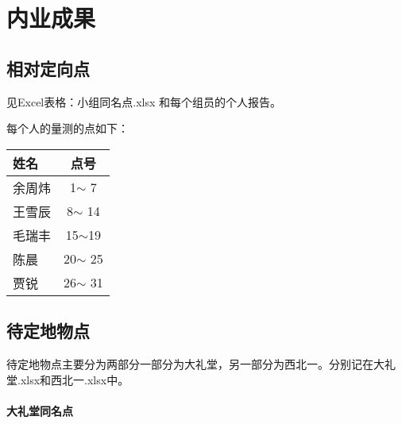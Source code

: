 \chapter{内业成果}
\section{相对定向点}

见Excel表格：小组同名点.xlsx 和每个组员的个人报告。

每个人的量测的点如下：
\begin{table}[htbp]
  \centering
  \begin{tabular}{p{5cm}c}
    \toprule
    姓名 & 点号 \\
    \midrule
    余周炜 & 1$\sim$ 7 \\
    王雪辰 & 8$\sim$ 14 \\
    毛瑞丰 & 15$\sim$19 \\
    陈晨 & 20$\sim$ 25 \\
    贾锐 & 26$\sim$ 31 \\
    \bottomrule 
  \end{tabular}
\end{table}

\section{待定地物点}

待定地物点主要分为两部分一部分为大礼堂，另一部分为西北一。分别记在大礼堂.xlsx和西北一.xlsx中。

\subsubsection{大礼堂同名点}

